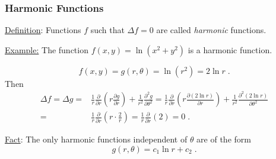 \begin{frame}
  \frametitle{Harmonic Functions}

\underline{Definition}: Functions $f$ such that $\Delta f=0$ are called \emph{harmonic} functions.
\pause
\smallskip

\underline{Example:} The function $f(x,y) = \ln{(x^2+y^2)}$ is a harmonic function.
\pause

%
$$f(x,y) = g(r,\theta) = \ln{(r^2)} = 2\ln r \; .$$
%
Then
%
\begin{align*}
  \Delta f = \Delta g = & \frac{1}{r}\frac{\partial }{\partial r} \left( r\frac{\partial g }{\partial r} \right) +  \frac{1}{r^2}\frac{\partial^2 g}{\partial \theta^2} = \frac{1}{r}\frac{\partial }{\partial r} \left( r\frac{\partial (2\ln{r}) }{\partial r} \right) +  \frac{1}{r^2}\frac{\partial^2 (2\ln{r})}{\partial \theta^2} \\
  = & \frac{1}{r}\frac{\partial }{\partial r} \left( r \cdot \frac{2}{r} \right) = \frac{1}{r}\frac{\partial }{\partial r} (2) = 0\; .
\end{align*}

\pause
\underline{Fact}: The only harmonic functions independent of $\theta$ are of the form
%
$$g(r,\theta) = c_1\ln{r}+c_2 \; .$$
\end{frame}